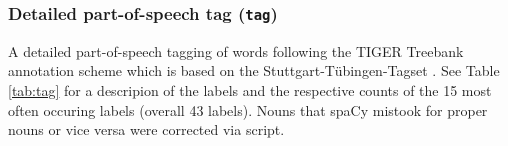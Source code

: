 \documentclass[10pt,a4paper,onecolumn]{article}
\begin{document}
\subsubsection*{Detailed part-of-speech tag (\texttt{tag})}
A detailed part-of-speech tagging of words following the TIGER Treebank
annotation scheme \citep{brants2004tiger} which is based on the
Stuttgart-Tübingen-Tagset \citep{schiller1999stts}.
See Table \ref{tab:tag} for a descripion  of the labels and the respective
counts of the 15 most often occuring labels (overall 43 labels). Nouns that
spaCy mistook for proper nouns or vice versa were corrected via script.
\end{document}
